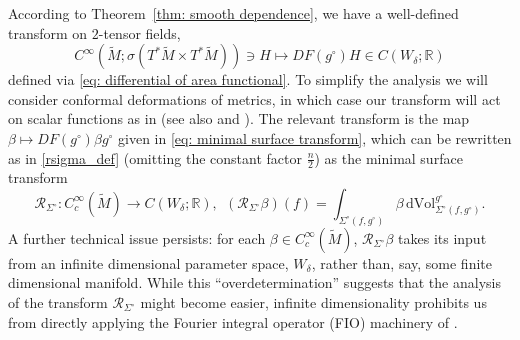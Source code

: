 \documentclass[11pt]{amsart}
\theoremstyle{definition}
\numberwithin{equation}{section}
\newcommand{\mR}{\mathbb{R}}                    %
\begin{document}
According to Theorem~\ref{thm: smooth dependence}, we have a well-defined transform on $2$-tensor fields, 
\[
	C^\infty(\widetilde{M}; \sigma(T^*\widetilde{M} \times T^*\widetilde{M}))\ni H\mapsto DF(g^\circ) H \in C(W_\delta;\mathbb R)
\]
defined via \eqref{eq: differential of area functional}. To simplify the analysis we will consider conformal deformations of metrics, in which case our transform will act on scalar functions as in \cite{MR812288,MST} (see also \cite[\S~8]{zbMATH03698077} and \cite{MR516965}). The relevant transform is the map $\beta \mapsto DF(g^\circ)\beta g^\circ$ given in \eqref{eq: minimal surface transform}, which can be rewritten as in \eqref{rsigma_def} (omitting the constant factor $\frac{n}{2}$) as the minimal surface transform  
\begin{equation}\label{eq:astrafo}
	\mathcal{R}_{\Sigma^{\circ}}: C_c^\infty(\widetilde{M}) \to C(W_{\delta}; \mR), \ \ (\mathcal{R}_{\Sigma^{\circ}} \beta)(f) = \int_{\Sigma^\circ(f,g^\circ)} \beta \,\mathrm{dVol}^{g^\circ}_{\Sigma^\circ(f,g^\circ)}.
\end{equation}
A further technical issue persists: for each $\beta\in C_c^\infty(\widetilde{M})$, $\mathcal{R}_{\Sigma^{\circ}} \beta$ takes its input from an infinite dimensional parameter space, $W_\delta$, rather than, say, some finite dimensional manifold. While this ``overdetermination'' suggests that the analysis of the transform $\mathcal{R}_{\Sigma^{\circ}}$ might become easier, infinite dimensionality prohibits us from directly applying the Fourier integral operator (FIO) machinery of \cite{MR812288,MST}.
\end{document}
